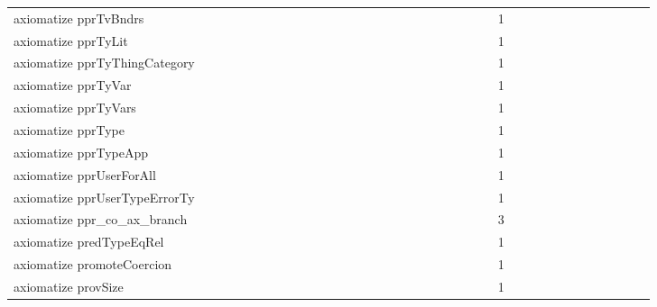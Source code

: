 {\begin{tabular}{l|rrr|rrr|rrr}
axiomatize pprTvBndrs &  &  &  &  &  &  &  &  &  &  &  &  &  &  &  &  &  &  &  &  &  &  &  & 1 &  &  &  &  &  &  &  &  &  &  &  & \\
axiomatize pprTyLit &  &  &  &  &  &  &  &  &  &  &  &  &  &  &  &  &  &  &  &  &  &  &  & 1 &  &  &  &  &  &  &  &  &  &  &  & \\
axiomatize pprTyThingCategory &  &  &  &  &  &  &  &  &  &  &  &  &  &  &  &  &  &  &  &  &  &  &  & 1 &  &  &  &  &  &  &  &  &  &  &  & \\
axiomatize pprTyVar &  &  &  &  &  &  &  &  &  &  &  &  &  &  &  &  &  &  &  &  &  &  &  & 1 &  &  &  &  &  &  &  &  &  &  &  & \\
axiomatize pprTyVars &  &  &  &  &  &  &  &  &  &  &  &  &  &  &  &  &  &  &  &  &  &  &  & 1 &  &  &  &  &  &  &  &  &  &  &  & \\
axiomatize pprType &  &  &  &  &  &  &  &  &  &  &  &  &  &  &  &  &  &  &  &  &  &  &  & 1 &  &  &  &  &  &  &  &  &  &  &  & \\
axiomatize pprTypeApp &  &  &  &  &  &  &  &  &  &  &  &  &  &  &  &  &  &  &  &  &  &  &  & 1 &  &  &  &  &  &  &  &  &  &  &  & \\
axiomatize pprUserForAll &  &  &  &  &  &  &  &  &  &  &  &  &  &  &  &  &  &  &  &  &  &  &  & 1 &  &  &  &  &  &  &  &  &  &  &  & \\
axiomatize pprUserTypeErrorTy &  &  &  &  &  &  &  &  &  &  &  &  &  &  &  &  &  &  &  &  &  &  &  & 1 &  &  &  &  &  &  &  &  &  &  &  & \\
axiomatize ppr_co_ax_branch &  &  &  &  &  &  &  &  &  &  &  &  &  &  &  &  &  &  &  &  &  &  &  & 3 &  &  &  &  &  &  &  &  &  &  &  & \\
axiomatize predTypeEqRel &  &  &  &  &  &  &  &  &  &  &  &  &  &  &  &  &  &  &  &  &  &  &  & 1 &  &  &  &  &  &  &  &  &  &  &  & \\
axiomatize promoteCoercion &  &  &  &  &  &  &  &  &  &  &  &  &  &  &  &  &  &  &  &  &  &  &  & 1 &  &  &  &  &  &  &  &  &  &  &  & \\
axiomatize provSize &  &  &  &  &  &  &  &  &  &  &  &  &  &  &  &  &  &  &  &  &  &  &  & 1 &  &  &  &  &  &  &  &  &  &  &  & \\

\end{tabular}}
